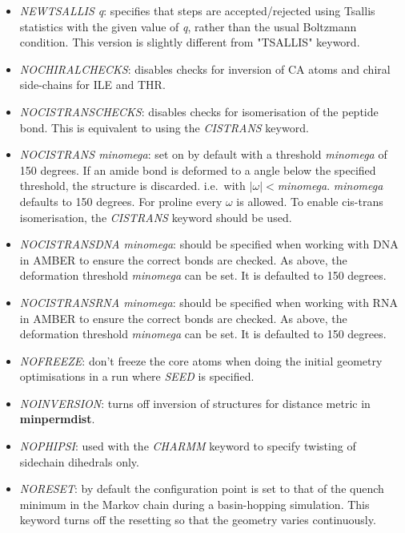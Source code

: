 \documentclass[12pt,a4paper,dvips]{article}
\begin{document}
\begin{itemize}
\item {\it NEWTSALLIS q\/}: specifies that steps are accepted/rejected using Tsallis statistics with the
given value of {\it q\/}, rather than the usual Boltzmann condition. This version is slightly different from "TSALLIS" keyword.

\item {\it NOCHIRALCHECKS\/}: disables checks for inversion of CA atoms and chiral side-chains for ILE and THR.

\item {\it NOCISTRANSCHECKS\/}: disables checks for isomerisation of the peptide bond. This is equivalent to using the {\it CISTRANS} keyword.

\item {\it NOCISTRANS minomega\/}: set on by default with a threshold {\it minomega} of 150 degrees.  
If an amide bond is deformed to a angle below the specified threshold, the structure is discarded. 
i.e.~with $|\omega|<${\it minomega}. {\it minomega\/} defaults to 150 degrees. 
For proline every $\omega$ is allowed. To enable cis-trans isomerisation, the {\it CISTRANS} keyword should be used. 

\item {\it NOCISTRANSDNA minomega\/}: should be specified when working with DNA in AMBER to ensure the correct bonds are 
checked. As above, the deformation threshold {\it minomega} can be set. It is defaulted to 150 degrees.

\item {\it NOCISTRANSRNA minomega\/}: should be specified when working with RNA in AMBER to ensure the correct bonds are 
checked. As above, the deformation threshold {\it minomega} can be set. It is defaulted to 150 degrees.

\item {\it NOFREEZE\/}: don't freeze the core atoms when doing the initial geometry optimisations in 
a run where {\it SEED\/} is specified.

\item {\it NOINVERSION\/}: turns off inversion of structures for distance
metric in {\bf minpermdist}.

\item{\it NOPHIPSI}: used with the {\it CHARMM} keyword to specify twisting of 
sidechain dihedrals only.

\item {\it NORESET\/}: by default the configuration point is set to that of the
quench minimum in the Markov chain during a basin-hopping simulation. This
keyword turns off the resetting so that the geometry varies continuously.


\end{itemize}
\end{document}
